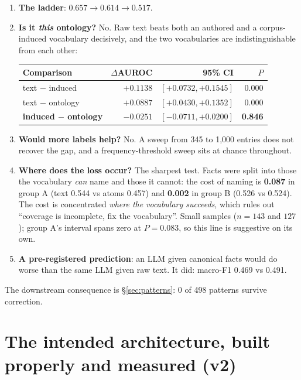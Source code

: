 \documentclass[12pt,a4paper]{article}
\begin{document}
\begin{enumerate}
\item \textbf{The ladder}: $0.657 \rightarrow 0.614 \rightarrow 0.517$.
\item \textbf{Is it \emph{this} ontology?} No. Raw text beats both an authored and a corpus-induced
vocabulary decisively, and the two vocabularies are indistinguishable from each other:
\begin{center}
\begin{tabular}{@{}lrrr@{}}
\toprule
\textbf{Comparison} & \textbf{$\Delta$AUROC} & \textbf{95\% CI} & \textbf{$P$} \\
\midrule
text $-$ induced & $+0.1138$ & $[+0.0732,+0.1545]$ & 0.000 \\
text $-$ ontology & $+0.0887$ & $[+0.0430,+0.1352]$ & 0.000 \\
\textbf{induced $-$ ontology} & $\mathbf{-0.0251}$ & $\mathbf{[-0.0711,+0.0200]}$ & \textbf{0.846} \\
\bottomrule
\end{tabular}
\end{center}
\item \textbf{Would more labels help?} No. A sweep from 345 to 1,000 entries does not recover the
gap, and a frequency-threshold sweep sits at chance throughout.
\item \textbf{Where does the loss occur?} The sharpest test. Facts were split into those the
vocabulary \emph{can} name and those it cannot: the cost of naming is \textbf{0.087} in group A
(text 0.544 vs atoms 0.457) and \textbf{0.002} in group B (0.526 vs 0.524). The cost is concentrated
\emph{where the vocabulary succeeds}, which rules out ``coverage is incomplete, fix the vocabulary''.
Small samples ($n=143$ and $127$); group A's interval spans zero at $P=0.083$, so this line is
suggestive on its own.
\item \textbf{A pre-registered prediction}: an LLM given canonical facts would do worse than the same
LLM given raw text. It did: macro-F1 0.469 vs 0.491.
\end{enumerate}

\noindent
The downstream consequence is §\ref{sec:patterns}: 0 of 498 patterns survive correction.

\section{The intended architecture, built properly and measured (v2)}\label{sec:v2}
\end{document}
